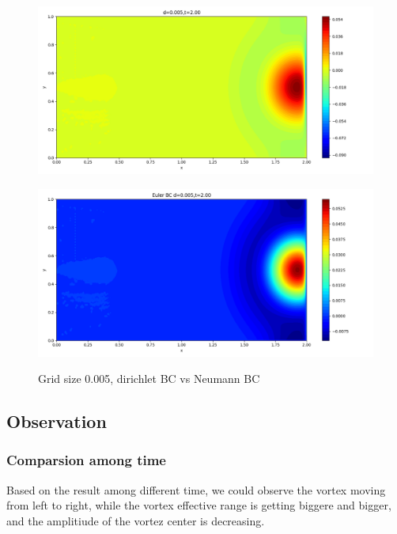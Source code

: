 \documentclass[12pt]{article}
\begin{document}
\begin{figure}[H]
\begin{minipage}{\linewidth}
\begin{minipage}{0.5\textwidth}
\includegraphics[width=\linewidth]{figures/3d0.005t2.00.png}
\label{fig9}
\end{minipage}\hfill
\begin{minipage}{0.5\textwidth}
\includegraphics[width=\linewidth]{figures/3Ed0.005t2.00.png}
\label{fig10}
\end{minipage}
\caption{Grid size 0.005, dirichlet BC vs Neumann BC}

\end{minipage}
\end{figure}


\subsection{Observation}

\subsubsection{Comparsion among time}
Based on the result among different time, we could observe
the vortex moving from left to right, while 
the vortex effective range is getting biggere and bigger, 
and the amplitiude of the vortez center is decreasing. 
\end{document}
